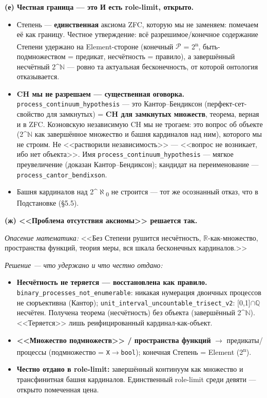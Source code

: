 \documentclass[11pt,a4paper]{article}
\begin{document}
\textbf{(е) Честная граница --- это И есть role-limit, открыто.}
\begin{itemize}
\item Степень --- \textbf{единственная} аксиома ZFC, которую мы не заменяем: помечаем её как границу. Честное утверждение: всё разрешимое/конечное содержание Степени удержано на Element-стороне (конечный $\mathcal{P}$ = 2\textsuperscript{n}, быть-подмножеством = предикат, несчётность = правило), а завершённый несчётный 2\textasciicircum{}$\mathbb{N}$ --- ровно та актуальная бесконечность, от которой онтология отказывается.
\item \textbf{CH мы не разрешаем --- существенная оговорка.} \texttt{process\_\allowbreak{}continuum\_\allowbreak{}hypothesis} --- это Кантор--Бендиксон (перфект-сет-свойство для замкнутых) = \textbf{CH для замкнутых множеств}, теорема, верная и в ZFC. Коэновскую независимую CH мы не трогаем: это вопрос об объекте (2\textasciicircum{}$\mathbb{N}$ как завершённое множество и башня кардиналов над ним), которого мы не строим. Не <<растворили независимость>> --- <<вопрос не возникает, ибо нет объекта>>. Имя \texttt{process\_\allowbreak{}continuum\_\allowbreak{}hypothesis} --- мягкое преувеличение (доказан Кантор--Бендиксон); кандидат на переименование --- \texttt{process\_\allowbreak{}cantor\_\allowbreak{}bendixson}.
\item Башня кардиналов над 2\textasciicircum{}$\aleph$\textsubscript{0} не строится --- тот же осознанный отказ, что в Подстановке (\S{}5.5).
\end{itemize}

\textbf{(ж) <<Проблема отсутствия аксиомы>> решается так.}

\emph{Опасение математика:} <<Без Степени рушится несчётность, $\mathbb{R}$-как-множество, пространства функций, теория меры, вся шкала бесконечных кардиналов.>>

\emph{Решение --- что удержано и что честно отдано:}
\begin{itemize}
\item \textbf{Несчётность не теряется --- восстановлена как правило.} \texttt{binary\_\allowbreak{}processes\_\allowbreak{}not\_\allowbreak{}enumerable}: никакая нумерация двоичных процессов не сюръективна (Кантор); \texttt{unit\_\allowbreak{}interval\_\allowbreak{}uncountable\_\allowbreak{}trisect\_\allowbreak{}v2}: [0,1]$\cap$$\mathbb{Q}$ несчётен. Получена теорема (несчётность) без объекта (завершённый 2\textasciicircum{}$\mathbb{N}$). <<Теряется>> лишь реифицированный кардинал-как-объект.
\item \textbf{<<Множество подмножеств>> / пространства функций} $\to$ предикаты/процессы (подмножество = \texttt{X$\to$bool}); конечная Степень = Element (2\textsuperscript{n}).
\item \textbf{Честно отдано в role-limit:} завершённый континуум как множество и трансфинитная башня кардиналов. Единственный role-limit среди девяти --- открыто помеченная цена.
\end{itemize}
\end{document}
